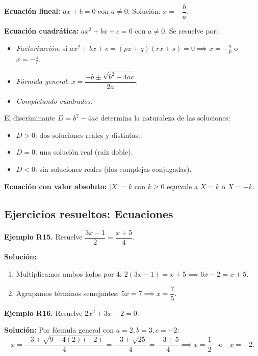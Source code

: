 \documentclass[12pt, letterpaper]{article}
\begin{document}
\begin{cuadroteoria}
      \textbf{Ecuación lineal:} $ax + b = 0$ con $a \neq 0$. Solución: $x = -\dfrac{b}{a}$.

      \textbf{Ecuación cuadrática:} $ax^2 + bx + c = 0$ con $a \neq 0$. Se resuelve por:
      \begin{itemize}[leftmargin=*]
            \item \emph{Factorización}: si $ax^2 + bx + c = (px + q)(rx + s) = 0 \implies x = -\frac{q}{p}$ o $x = -\frac{s}{r}$.
            \item \emph{Fórmula general}: $x = \dfrac{-b \pm \sqrt{b^2 - 4ac}}{2a}$.
            \item \emph{Completando cuadrados}.
      \end{itemize}
      El discriminante $D = b^2 - 4ac$ determina la naturaleza de las soluciones:
      \begin{itemize}
            \item $D > 0$: dos soluciones reales y distintas.
            \item $D = 0$: una solución real (raíz doble).
            \item $D < 0$: sin soluciones reales (dos complejas conjugadas).
      \end{itemize}

      \textbf{Ecuación con valor absoluto:} $|X| = k$ con $k \geq 0$ equivale a $X = k$ o $X = -k$.
\end{cuadroteoria}

\subsection{Ejercicios resueltos: Ecuaciones}

\textbf{Ejemplo R15.} Resuelve $\dfrac{3x - 1}{2} = \dfrac{x + 5}{4}$.

\begin{cuadrosolucion}
      \textbf{Solución:}
      \begin{enumerate}
            \item Multiplicamos ambos lados por 4: $2(3x - 1) = x + 5 \implies 6x - 2 = x + 5$.
            \item Agrupamos términos semejantes: $5x = 7 \implies x = \dfrac{7}{5}$.
      \end{enumerate}
\end{cuadrosolucion}

\textbf{Ejemplo R16.} Resuelve $2x^2 + 3x - 2 = 0$.

\begin{cuadrosolucion}
      \textbf{Solución:}
      Por fórmula general con $a = 2, b = 3, c = -2$:
      $$x = \frac{-3 \pm \sqrt{9 - 4(2)(-2)}}{4} = \frac{-3 \pm \sqrt{25}}{4} = \frac{-3 \pm 5}{4} \implies x = \frac{1}{2} \quad\text{o}\quad x = -2.$$
\end{cuadrosolucion}
\end{document}
